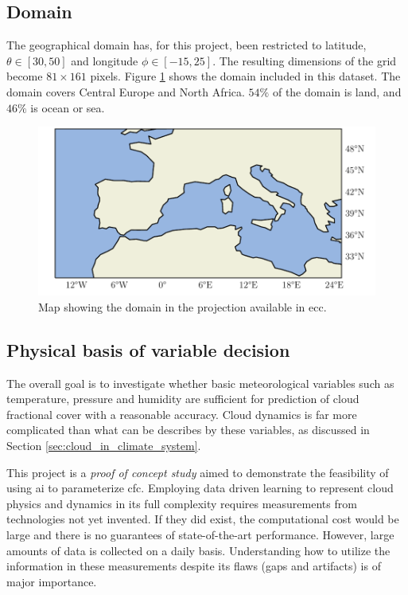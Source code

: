 \subsection{Domain}
The geographical domain has, for this project, been restricted to latitude, $\theta \in[30,50]$ and longitude $\phi \in [-15, 25]$. The resulting dimensions of the grid become $81\times161$ pixels. Figure \ref{fig:map} shows the domain included in this dataset. The domain covers Central Europe and North Africa. $54\%$ of the domain is land, and $46\%$ is ocean or sea. 
\begin{figure}[h]
    \centering
    \includegraphics[scale = 1.0]{python_figs/Domain.pdf}
    \caption{Map showing the domain in the projection available in \acrshort{ecc}.}
    \label{fig:map}
\end{figure}

\subsection{Physical basis of variable decision} \label{sec:ecc}
The overall goal is to investigate whether basic meteorological variables such as temperature, pressure and humidity are sufficient for prediction of cloud fractional cover with a reasonable accuracy. Cloud dynamics is far more complicated than what can be describes by these variables, as discussed in Section \ref{sec:cloud_in_climate_system}.

This project is a \textit{proof of concept study} aimed to demonstrate the feasibility of using \acrshort{ai} to parameterize \acrshort{cfc}. Employing data driven learning to represent cloud physics and dynamics in its full complexity requires measurements from technologies not yet invented. If they did exist, the computational cost would be large and there is no guarantees of state-of-the-art performance. However, large amounts of data is collected on a daily basis. Understanding how to utilize the information in these measurements despite its flaws (gaps and artifacts) is of major importance. 

